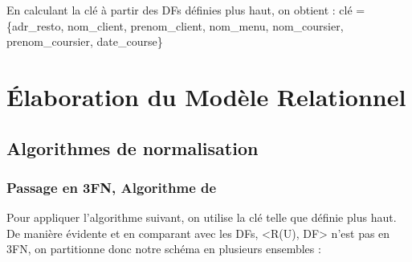 \documentclass[french]{article}
\begin{document}
            En calculant la clé à partir des DFs définies plus haut, on obtient : \newline
                clé = \{adr\_resto, nom\_client, prenom\_client, nom\_menu, nom\_coursier, prenom\_coursier, \newline date\_course\}
            \newpage

    \section{Élaboration du Modèle Relationnel}
        \subsection*{Algorithmes de normalisation}
            \subsubsection *{Passage en 3FN, Algorithme de }
                Pour appliquer l'algorithme suivant, on utilise la clé telle que définie plus haut. De manière évidente et en comparant avec les DFs, <R(U), DF> n'est pas en 3FN, on partitionne donc notre schéma en plusieurs ensembles :
\end{document}
